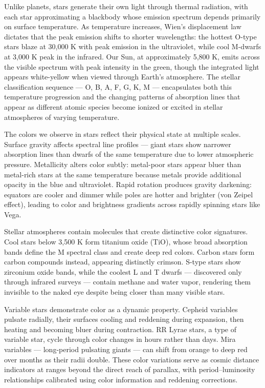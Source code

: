 Unlike planets, stars generate their own light through thermal radiation, with each star approximating a blackbody whose emission spectrum depends primarily on surface temperature. As temperature increases, Wien's displacement law dictates that the peak emission shifts to shorter wavelengths: the hottest O-type stars blaze at 30,000 K with peak emission in the ultraviolet, while cool M-dwarfs at 3,000 K peak in the infrared. Our Sun, at approximately 5,800 K, emits across the visible spectrum with peak intensity in the green, though the integrated light appears white-yellow when viewed through Earth's atmosphere. The stellar classification sequence — O, B, A, F, G, K, M — encapsulates both this temperature progression and the changing patterns of absorption lines that appear as different atomic species become ionized or excited in stellar atmospheres of varying temperature.

The colors we observe in stars reflect their physical state at multiple scales. Surface gravity affects spectral line profiles — giant stars show narrower absorption lines than dwarfs of the same temperature due to lower atmospheric pressure. Metallicity alters color subtly: metal-poor stars appear bluer than metal-rich stars at the same temperature because metals provide additional opacity in the blue and ultraviolet. Rapid rotation produces gravity darkening: equators are cooler and dimmer while poles are hotter and brighter (von Zeipel effect), leading to color and brightness gradients across rapidly spinning stars like Vega.

Stellar atmospheres contain molecules that create distinctive color signatures. Cool stars below 3,500 K form titanium oxide (TiO), whose broad absorption bands define the M spectral class and create deep red colors. Carbon stars form carbon compounds instead, appearing distinctly crimson. S-type stars show zirconium oxide bands, while the coolest L and T dwarfs — discovered only through infrared surveys — contain methane and water vapor, rendering them invisible to the naked eye despite being closer than many visible stars.

Variable stars demonstrate color as a dynamic property. Cepheid variables pulsate radially, their surfaces cooling and reddening during expansion, then heating and becoming bluer during contraction. RR Lyrae stars, a type of variable star, cycle through color changes in hours rather than days. Mira variables — long-period pulsating giants — can shift from orange to deep red over months as their radii double. These color variations serve as cosmic distance indicators at ranges beyond the direct reach of parallax, with period–luminosity relationships calibrated using color information and reddening corrections.

